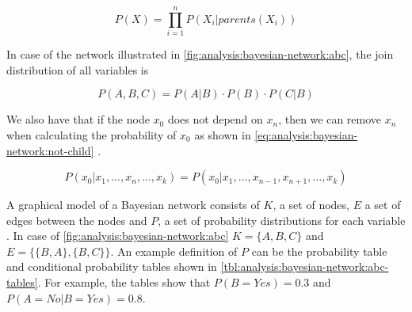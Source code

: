 \begin{equation}
\label{eq:analysis:bayesian-network:prod}
P(X) = \displaystyle \prod_{i=1}^{n} P(X_i|parents(X_i))
\end{equation}

In case of the network illustrated in \cref{fig:analysis:bayesian-network:abc}, the join distribution of all variables is

\begin{equation}
P(A, B, C) = P(A|B) \cdot P(B) \cdot P(C|B)
\end{equation}

We also have that if the node $x_0$ does not depend on $x_n$, then we can remove $x_n$ when calculating the probability of $x_0$ as shown in \cref{eq:analysis:bayesian-network:not-child} \cite{stephenson2000introduction}.

\begin{equation}
\label{eq:analysis:bayesian-network:not-child}
P(x_0|x_1,\ldots,x_n,\ldots,x_k) = P(x_0|x_1,\ldots,x_{n-1},x_{n+1},\ldots,x_k)
\end{equation}

A graphical model of a Bayesian network consists of $K$, a set of nodes, $E$ a set of edges between the nodes and $P$, a set of probability distributions for each variable \cite{stephenson2000introduction}. In case of \cref{fig:analysis:bayesian-network:abc} $K = \{A, B, C\}$ and $E = \{\{B, A\}, \{B,C\}\}$. An example definition of $P$ can be the probability table and conditional probability tables shown in \cref{tbl:analysis:bayesian-network:abc-tables}. For example, the tables show that $P(B=Yes) = 0.3$ and $P(A=No|B=Yes) = 0.8$.

